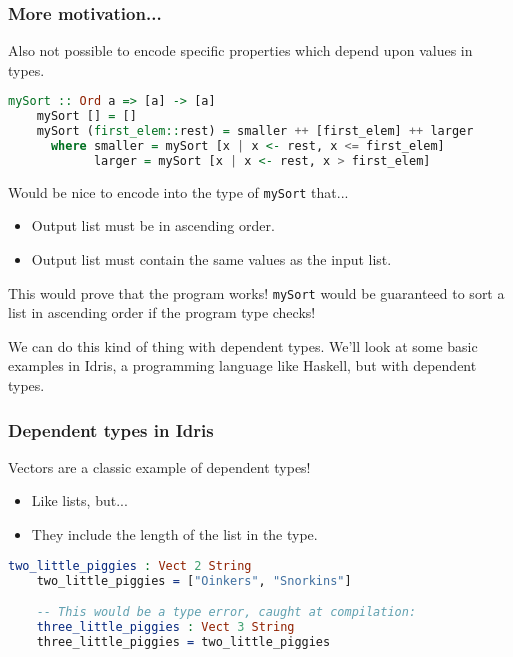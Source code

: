 \documentclass{beamer}
\begin{document}
\begin{frame}[fragile]
  \frametitle{More motivation...}

  Also not possible to encode specific properties which depend upon values in types.

  \begin{lstlisting}[frame=single, language=Haskell, breaklines=true, basicstyle=\ttfamily\tiny]
    mySort :: Ord a => [a] -> [a]
    mySort [] = []
    mySort (first_elem::rest) = smaller ++ [first_elem] ++ larger
      where smaller = mySort [x | x <- rest, x <= first_elem]
            larger = mySort [x | x <- rest, x > first_elem]
  \end{lstlisting}

  \pause
  Would be nice to encode into the type of \texttt{mySort} that...
  
  \begin{itemize}
  \pause
  \item Output list must be in ascending order.
  \pause
  \item Output list must contain the same values as the input list.
  \end{itemize}

  \pause

  This would prove that the program works! \texttt{mySort} would be
  guaranteed to sort a list in ascending order if the program type
  checks!

  \pause

  We can do this kind of thing with dependent types. We'll look at
  some basic examples in Idris, a programming language like Haskell, but
  with dependent types.
\end{frame}

\begin{frame}[fragile]
  \frametitle{Dependent types in Idris}

  Vectors are a classic example of dependent types!

  \begin{itemize}
  \pause
  \item Like lists, but...
  \pause
  \item They include the length of the list in the type.
  \end{itemize}

  \begin{lstlisting}[frame=single, language=Idris, breaklines=true, basicstyle=\ttfamily\tiny]
    two_little_piggies : Vect 2 String
    two_little_piggies = ["Oinkers", "Snorkins"]

    -- This would be a type error, caught at compilation:
    three_little_piggies : Vect 3 String
    three_little_piggies = two_little_piggies
  \end{lstlisting}
\end{frame}
\end{document}
